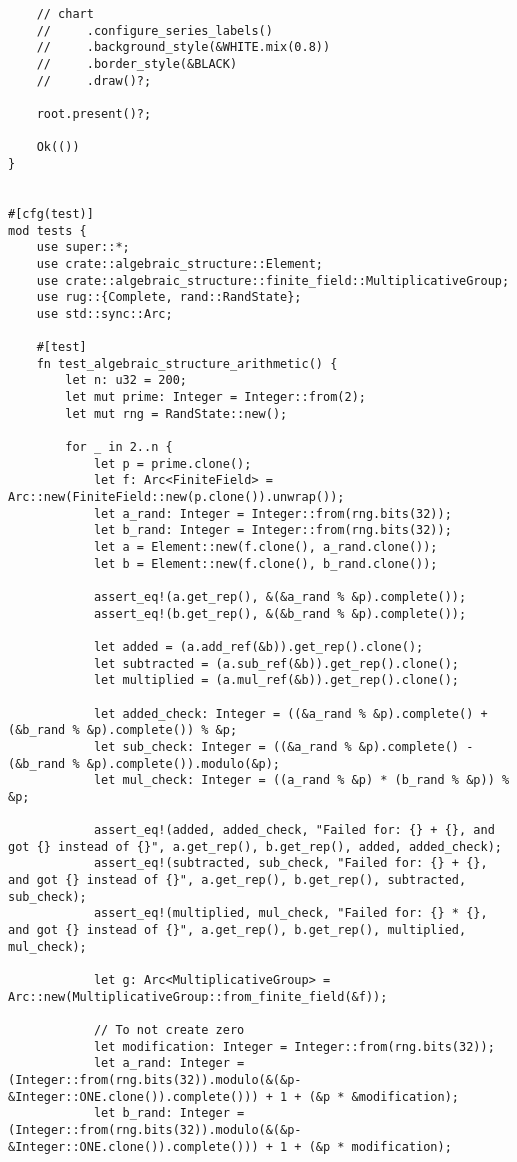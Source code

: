 \begin{verbatim}
    // chart
    //     .configure_series_labels()
    //     .background_style(&WHITE.mix(0.8))
    //     .border_style(&BLACK)
    //     .draw()?;

    root.present()?;

    Ok(())
}


#[cfg(test)]
mod tests {
    use super::*;
    use crate::algebraic_structure::Element;
    use crate::algebraic_structure::finite_field::MultiplicativeGroup;
    use rug::{Complete, rand::RandState};
    use std::sync::Arc;

    #[test]
    fn test_algebraic_structure_arithmetic() {
        let n: u32 = 200;
        let mut prime: Integer = Integer::from(2);
        let mut rng = RandState::new();

        for _ in 2..n {
            let p = prime.clone();
            let f: Arc<FiniteField> = Arc::new(FiniteField::new(p.clone()).unwrap());
            let a_rand: Integer = Integer::from(rng.bits(32));
            let b_rand: Integer = Integer::from(rng.bits(32));
            let a = Element::new(f.clone(), a_rand.clone());
            let b = Element::new(f.clone(), b_rand.clone());

            assert_eq!(a.get_rep(), &(&a_rand % &p).complete());
            assert_eq!(b.get_rep(), &(&b_rand % &p).complete());

            let added = (a.add_ref(&b)).get_rep().clone();
            let subtracted = (a.sub_ref(&b)).get_rep().clone();
            let multiplied = (a.mul_ref(&b)).get_rep().clone();

            let added_check: Integer = ((&a_rand % &p).complete() + (&b_rand % &p).complete()) % &p;
            let sub_check: Integer = ((&a_rand % &p).complete() - (&b_rand % &p).complete()).modulo(&p);
            let mul_check: Integer = ((a_rand % &p) * (b_rand % &p)) % &p;

            assert_eq!(added, added_check, "Failed for: {} + {}, and got {} instead of {}", a.get_rep(), b.get_rep(), added, added_check);
            assert_eq!(subtracted, sub_check, "Failed for: {} + {}, and got {} instead of {}", a.get_rep(), b.get_rep(), subtracted, sub_check);
            assert_eq!(multiplied, mul_check, "Failed for: {} * {}, and got {} instead of {}", a.get_rep(), b.get_rep(), multiplied, mul_check);

            let g: Arc<MultiplicativeGroup> = Arc::new(MultiplicativeGroup::from_finite_field(&f));

            // To not create zero
            let modification: Integer = Integer::from(rng.bits(32));
            let a_rand: Integer = (Integer::from(rng.bits(32)).modulo(&(&p-&Integer::ONE.clone()).complete())) + 1 + (&p * &modification);
            let b_rand: Integer = (Integer::from(rng.bits(32)).modulo(&(&p-&Integer::ONE.clone()).complete())) + 1 + (&p * modification);


\end{verbatim}
